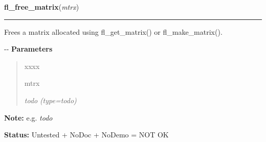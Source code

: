     \label{xformslib:flflimage:fl_free_matrix}

    \vspace{0.5ex}

\hspace{.8\funcindent}\begin{boxedminipage}{\funcwidth}

    \raggedright \textbf{fl\_free\_matrix}(\textit{mtrx})

    \vspace{-1.5ex}

    \rule{\textwidth}{0.5\fboxrule}
\setlength{\parskip}{2ex}

Frees a matrix allocated using fl\_get\_matrix() or fl\_make\_matrix().

-{}-
\setlength{\parskip}{1ex}
      \textbf{Parameters}
      \vspace{-1ex}

      \begin{quote}
        \begin{Ventry}{xxxx}

          \item[mtrx]


\emph{todo}
            {\it (type=\emph{todo})}

        \end{Ventry}

      \end{quote}

\textbf{Note:} 
e.g. \emph{todo}


\textbf{Status:} 
Untested + NoDoc + NoDemo = NOT OK


    \end{boxedminipage}

    \label{xformslib:flflimage:fl_lookup_RGBcolor}

    \vspace{0.5ex}

